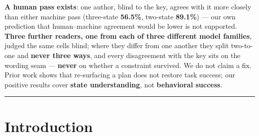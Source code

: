 \documentclass[
]{article}
\begin{document}
\textbf{A human pass exists}: one author, blind to the key, agrees with
it more closely than either machine pass (three-state \textbf{56.5\%},
two-state \textbf{89.1\%}) --- our own prediction that human--machine
agreement would be lower is not supported. \textbf{Three further
readers, one from each of three different model families}, judged the
same cells blind; where they differ from one another they split
two-to-one and \textbf{never three ways}, and every disagreement with
the key sits on the wording seam --- \textbf{never} on whether a
constraint survived. We do not claim a fix. Prior work shows that
re-surfacing a plan does not restore task success; our positive results
cover \textbf{state understanding}, not \textbf{behavioral success}.

\begin{center}\rule{0.5\linewidth}{0.5pt}\end{center}

\section{Introduction}\label{introduction}
\end{document}
